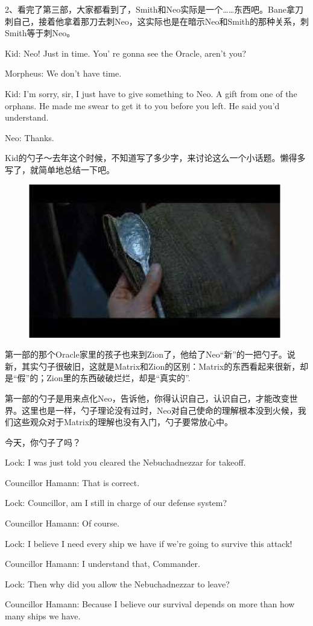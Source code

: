 \documentclass[UTF8]{ctexart}
\newenvironment{myquote}{\color{green} \setlength{\leftskip}{6em} \setlength{\rightskip}{4em} \setlength{\parindent}{-2em}}{\par}
\begin{document}
2、看完了第三部，大家都看到了，Smith和Neo实际是一个……东西吧。Bane拿刀刺自己，接着他拿着那刀去刺Neo，这实际也是在暗示Neo和Smith的那种关系，刺Smith等于刺Neo。

\begin{myquote}
Kid: Neo! Just in time. You' re gonna see the Oracle, aren't you?

Morpheus: We don't have time.

Kid: I'm sorry, sir, I just have to give something to Neo. A gift from one of the orphans. He made me swear to get it to you before you left. He said you'd understand.

Neo: Thanks.
\end{myquote}

Kid的勺子～去年这个时候，不知道写了多少字，来讨论这么一个小话题。懒得多写了，就简单地总结一下吧。

\begin{figure}[htb]
\centering
\includegraphics[width=0.5\linewidth]{fig/read_reloaded-54}
\end{figure}

第一部的那个Oracle家里的孩子也来到Zion了，他给了Neo“新”的一把勺子。说新，其实勺子很破旧，这就是Matrix和Zion的区别：Matrix的东西看起来很新，却是“假”的；Zion里的东西破破烂烂，却是“真实的”.

第一部的勺子是用来点化Neo，告诉他，你得认识自己，认识自己，才能改变世界。这里也是一样，勺子理论没有过时，Neo对自己使命的理解根本没到火候，我们这些观众对于Matrix的理解也没有入门，勺子要常放心中。

今天，你勺子了吗？

\begin{myquote}
Lock: I was just told you cleared the Nebuchadnezzar for takeoff.

Councillor Hamann: That is correct.

Lock: Councillor, am I still in charge of our defense system?

Councillor Hamann: Of course.

Lock: I believe I need every ship we have if we're going to survive this attack!

Councillor Hamann: I understand that, Commander.

Lock: Then why did you allow the Nebuchadnezzar to leave?

Councillor Hamann: Because I believe our survival depends on more than how many ships we have.
\end{myquote}
\end{document}
